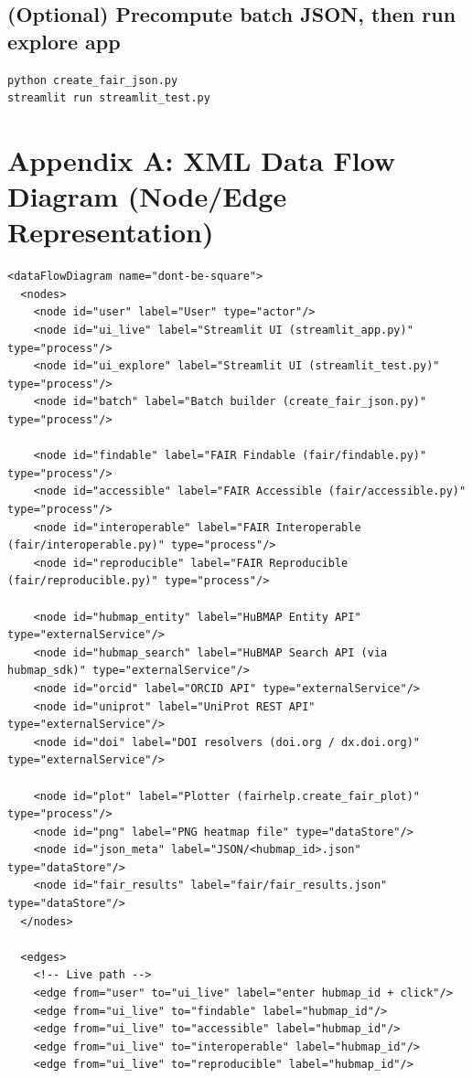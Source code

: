 \documentclass[11pt]{article}
\begin{document}
\subsection{(Optional) Precompute batch JSON, then run explore app}
\begin{lstlisting}[style=base,caption={Precompute results then explore.}]
python create_fair_json.py
streamlit run streamlit_test.py
\end{lstlisting}

\appendix
\section{Appendix A: XML Data Flow Diagram (Node/Edge Representation)}
\begin{lstlisting}[style=xml,caption={XML data flow model capturing the system nodes and edges.}]
<dataFlowDiagram name="dont-be-square">
  <nodes>
    <node id="user" label="User" type="actor"/>
    <node id="ui_live" label="Streamlit UI (streamlit_app.py)" type="process"/>
    <node id="ui_explore" label="Streamlit UI (streamlit_test.py)" type="process"/>
    <node id="batch" label="Batch builder (create_fair_json.py)" type="process"/>

    <node id="findable" label="FAIR Findable (fair/findable.py)" type="process"/>
    <node id="accessible" label="FAIR Accessible (fair/accessible.py)" type="process"/>
    <node id="interoperable" label="FAIR Interoperable (fair/interoperable.py)" type="process"/>
    <node id="reproducible" label="FAIR Reproducible (fair/reproducible.py)" type="process"/>

    <node id="hubmap_entity" label="HuBMAP Entity API" type="externalService"/>
    <node id="hubmap_search" label="HuBMAP Search API (via hubmap_sdk)" type="externalService"/>
    <node id="orcid" label="ORCID API" type="externalService"/>
    <node id="uniprot" label="UniProt REST API" type="externalService"/>
    <node id="doi" label="DOI resolvers (doi.org / dx.doi.org)" type="externalService"/>

    <node id="plot" label="Plotter (fairhelp.create_fair_plot)" type="process"/>
    <node id="png" label="PNG heatmap file" type="dataStore"/>
    <node id="json_meta" label="JSON/<hubmap_id>.json" type="dataStore"/>
    <node id="fair_results" label="fair/fair_results.json" type="dataStore"/>
  </nodes>

  <edges>
    <!-- Live path -->
    <edge from="user" to="ui_live" label="enter hubmap_id + click"/>
    <edge from="ui_live" to="findable" label="hubmap_id"/>
    <edge from="ui_live" to="accessible" label="hubmap_id"/>
    <edge from="ui_live" to="interoperable" label="hubmap_id"/>
    <edge from="ui_live" to="reproducible" label="hubmap_id"/>


\end{lstlisting}
\end{document}
